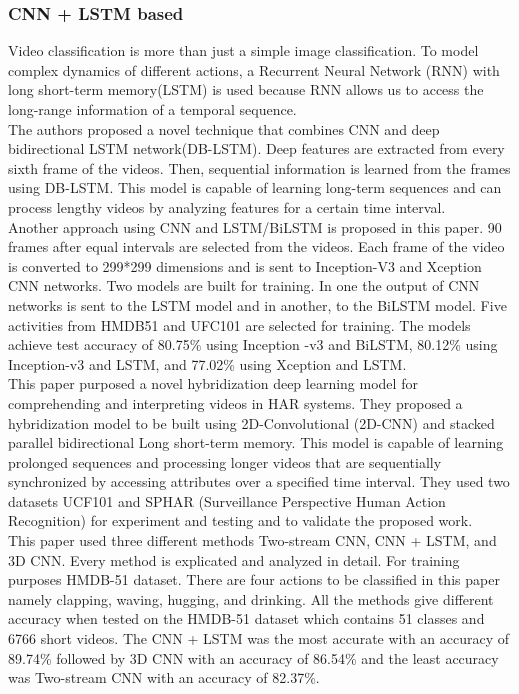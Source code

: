 \documentclass[twocolumn]{article}
\begin{document}
\subsubsection{CNN + LSTM based}
Video classification is more than just a simple image classification. To model complex dynamics of different actions, a Recurrent Neural Network (RNN) with long short-term memory(LSTM) is used because RNN allows us to access the long-range information of a temporal sequence.\\
\cite{b7} The authors proposed a novel technique that combines CNN and deep bidirectional LSTM network(DB-LSTM). Deep features are extracted from every sixth frame of the videos. Then, sequential information is learned from the frames using DB-LSTM. This model is capable of learning long-term sequences and can process lengthy videos by analyzing features for a certain time interval.\\
\cite{b8} Another approach using CNN and LSTM/BiLSTM is proposed in this paper. 90 frames after equal intervals are selected from the videos. Each frame of the video is converted to 299*299 dimensions and is sent to Inception-V3 and Xception CNN networks. Two models are built for training. In one the output of CNN networks is sent to the LSTM model and in another, to the BiLSTM model. Five activities from HMDB51 and UFC101 are selected for training. The models achieve test accuracy of 80.75\% using Inception -v3 and BiLSTM, 80.12\% using Inception-v3 and LSTM, and 77.02\% using Xception and LSTM.\\
\cite{b9} This paper purposed a novel hybridization deep learning model for comprehending and interpreting videos in HAR systems. They proposed a hybridization model to be built using 2D-Convolutional (2D-CNN) and stacked parallel bidirectional Long short-term memory. This model is capable of learning prolonged sequences and processing longer videos that are sequentially synchronized by accessing attributes over a specified time interval. They used two datasets UCF101 and SPHAR (Surveillance Perspective Human Action Recognition) for experiment and testing and to validate the proposed work.\\
\cite{b10} This paper used three different methods Two-stream CNN, CNN + LSTM, and 3D CNN. Every method is explicated and analyzed in detail. For training purposes HMDB-51 dataset. There are four actions to be classified in this paper namely clapping, waving, hugging, and drinking. All the methods give different accuracy when tested on the HMDB-51 dataset which contains 51 classes and 6766 short videos. The CNN + LSTM was the most accurate with an accuracy of 89.74\% followed by 3D CNN with an accuracy of 86.54\% and the least accuracy was Two-stream CNN with an accuracy of 82.37\%.\\
\end{document}
